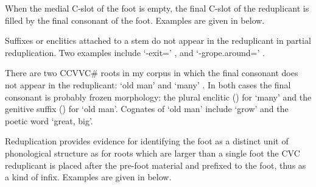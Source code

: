 When the medial C-slot of the foot is empty,
the final C-slot of the reduplicant is filled by
the final consonant of the foot.
Examples are given in  below.

\newpage
\begin{exe}
	\label{ex:ParRedEmpMedCSlo}
\end{exe}

Suffixes or enclitics attached to a stem do not appear in the reduplicant in partial reduplication.
Two examples include  `{\n}-exit={\einV}' {\ra} ,
and  `{\na}-grope.around={\einV}' {\ra} .

There are two CCVVC{\#} roots in my corpus in which the final consonant does
not appear in the reduplicant:
 `old man' {\ra} 
and  `many' {\ra} .
In both cases the final consonant is probably frozen morphology:
the plural enclitic   () for  `many'
and the genitive suffix  () for  `old man'.
Cognates of  `old man' include
 `grow' and the poetic word  `great, big'.

Reduplication provides evidence for identifying
the foot as a distinct unit of phonological structure
as for roots which are larger than a single foot
the CVC reduplicant is placed after the
pre-foot material and prefixed to the foot,
thus as a kind of infix.
Examples are given in  below.

